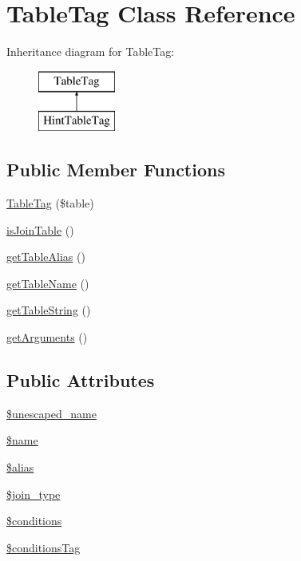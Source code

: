\hypertarget{classTableTag}{}\section{Table\+Tag Class Reference}
\label{classTableTag}
Inheritance diagram for Table\+Tag\+:\begin{figure}[H]
\begin{center}
\leavevmode
\includegraphics[height=2.000000cm]{classTableTag}
\end{center}
\end{figure}
\subsection*{Public Member Functions}
\begin{DoxyCompactItemize}
\item 
\hyperlink{classTableTag_a27f151c3ff35cf3a89242ae896fae444}{Table\+Tag} (\$table)
\item 
\hyperlink{classTableTag_ac27cd91a8df4854bc7598260a030bd7b}{is\+Join\+Table} ()
\item 
\hyperlink{classTableTag_a52a3da2a0eee31ce88e44e38e71dfa9a}{get\+Table\+Alias} ()
\item 
\hyperlink{classTableTag_aca16238dff09141c6de5590416c872fb}{get\+Table\+Name} ()
\item 
\hyperlink{classTableTag_a51d350dda88e10bd240831af89e10fd1}{get\+Table\+String} ()
\item 
\hyperlink{classTableTag_a39fa54b8c8be305fec72ce6b7e9920a3}{get\+Arguments} ()
\end{DoxyCompactItemize}
\subsection*{Public Attributes}
\begin{DoxyCompactItemize}
\item 
\hyperlink{classTableTag_aa7fe4c9dfe7ea60993ebaf0bd2f24e56}{\$unescaped\+\_\+name}
\item 
\hyperlink{classTableTag_adab1e27e976c86151cadf9dd315427c7}{\$name}
\item 
\hyperlink{classTableTag_a4c65f27c8fdf150de28ff081d7e214e8}{\$alias}
\item 
\hyperlink{classTableTag_ac78ab418306b73bfba9782dcea2b5436}{\$join\+\_\+type}
\item 
\hyperlink{classTableTag_a7d7a1d2b61dc48eb0ee9928c85259221}{\$conditions}
\item 
\hyperlink{classTableTag_adb5ca6b036a491af6be55e2253393ccc}{\$conditions\+Tag}
\end{DoxyCompactItemize}



